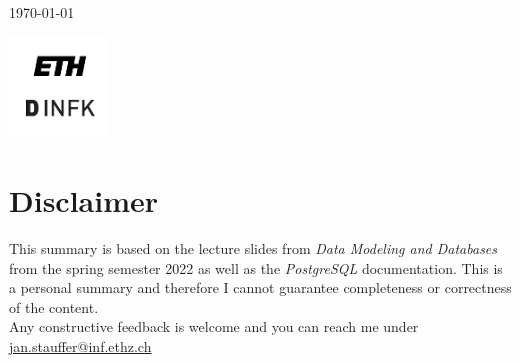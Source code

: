 \begin{titlepage}
	{\large \today} %
	
	
	\vfill\vfill
	\includegraphics[width=0.2\textwidth]{eth-logo.png}\\[1cm] %
	 
	
	\vfill %
	
\end{titlepage}


\section*{Disclaimer}
This summary is based on the lecture slides from \textit{Data Modeling and Databases} from the spring semester 2022 as well as the \textit{PostgreSQL} documentation. This is a personal summary and therefore I cannot guarantee completeness or correctness of the content.\\
Any constructive feedback is welcome and you can reach me under \href{mailto:jan.stauffer@inf.ethz.ch}{jan.stauffer@inf.ethz.ch}
\newpage
\tableofcontents
\newpage

